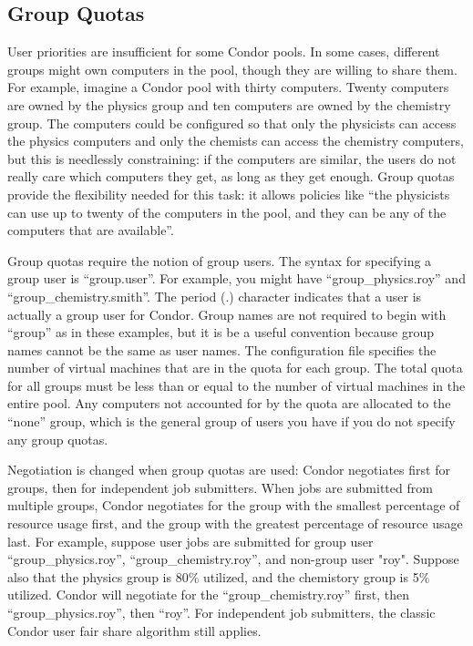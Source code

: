 \subsection{Group Quotas}

User priorities are insufficient for some Condor pools. In some cases,
different groups might own computers in the pool, though they are
willing to share them. For example, imagine a Condor pool with thirty
computers. Twenty computers are owned by the physics group and ten
computers are owned by the chemistry group. The computers could be
configured so that only the physicists can access the physics
computers and only the chemists can access the chemistry computers,
but this is needlessly constraining: if the computers are similar, the
users do not really care which computers they get, as long as they get
enough. Group quotas provide the flexibility needed for this task: it
allows policies like ``the physicists can use up to twenty of the
computers in the pool, and they can be any of the computers that are
available''.

Group quotas require the notion of group users. The syntax for
specifying a group user is ``group.user''. For example, you might have
``group\_physics.roy'' and ``group\_chemistry.smith''. The period (.)
character indicates that a user is actually a group user for
Condor. Group names are not required to begin with ``group'' as in
these examples, but it is be a useful convention because group names
cannot be the same as user names. The configuration file specifies the
number of virtual machines that are in the quota for each group. The
total quota for all groups must be less than or equal to the number of
virtual machines in the entire pool. Any computers not accounted for
by the quota are allocated to the ``none'' group, which is the general
group of users you have if you do not specify any group quotas.

Negotiation is changed when group quotas are used: Condor negotiates
first for groups, then for independent job submitters.  When jobs are
submitted from multiple groups, Condor negotiates for the group with
the smallest percentage of resource usage first, and the group with
the greatest percentage of resource usage last.  For example, suppose
user jobs are submitted for group user ``group\_physics.roy'',
``group\_chemistry.roy'', and non-group user "roy".  Suppose also that
the physics group is 80\% utilized, and the chemistory group is 5\%
utilized.  Condor will negotiate for the ``group\_chemistry.roy''
first, then ``group\_physics.roy'', then ``roy''.  For independent job
submitters, the classic Condor user fair share algorithm still
applies.

